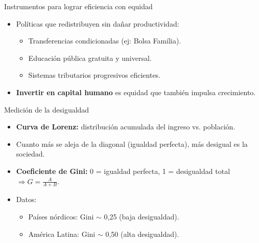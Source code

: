 \documentclass{beamer}
\begin{document}
\begin{frame}{Instrumentos para lograr eficiencia con equidad}
    \begin{itemize}
        \item Políticas que redistribuyen sin dañar productividad:
        \begin{itemize}
            \item Transferencias condicionadas (ej: Bolsa Família).
            \item Educación pública gratuita y universal.
            \item Sistemas tributarios progresivos eficientes.
        \end{itemize}
        \item \textbf{Invertir en capital humano} es equidad que también impulsa crecimiento.
    \end{itemize}
\end{frame}

\begin{frame}{Medición de la desigualdad}
    \begin{itemize}
        \item \textbf{Curva de Lorenz:} distribución acumulada del ingreso vs. población.
        \item Cuanto más se aleja de la diagonal (igualdad perfecta), más desigual es la sociedad.
        \item \textbf{Coeficiente de Gini:} 0 = igualdad perfecta, 1 = desigualdad total $\Rightarrow G=\frac{A}{A+B}$.
        \item Datos:
        \begin{itemize}
            \item Países nórdicos: Gini $\sim$ 0{,}25 (baja desigualdad).
            \item América Latina: Gini $\sim$ 0{,}50 (alta desigualdad).
        \end{itemize}
    \end{itemize}
\end{frame}
\end{document}
